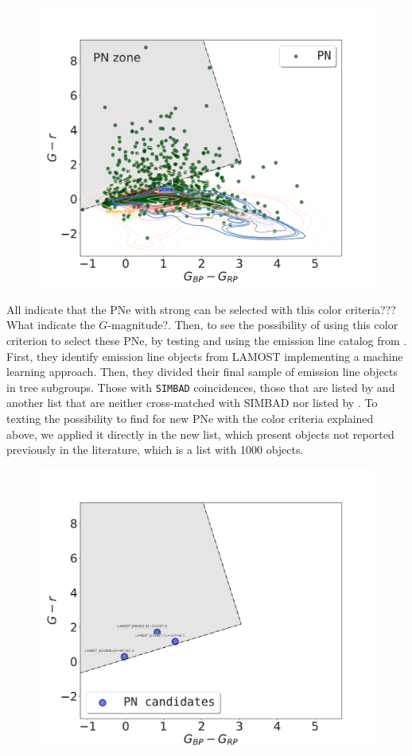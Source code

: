 \documentclass[fleqn,usenatbib]{mnras}
\begin{document}
\begin{figure}
\centering
  \includegraphics[width=0.9\linewidth]{Figs/color-diagram-ps-gaiaEDR3.pdf}
  \caption{} 
  \label{fig:gaia-ps}
\end{figure}

All indicate that the PNe with strong \ha{} can be selected with this color criteria??? What indicate the $G$-magnitude?.
Then, to see the possibility of using this color criterion to select these PNe, by
testing and using the emission line catalog from  \citet{Skoda:2020}. First, they
identify emission line objects from LAMOST  implementing a machine learning approach.
Then, they divided their final sample of emission line objects in tree subgroups. Those with \texttt{SIMBAD}
coincidences, those that are listed by \citet{Hou:2016} and another list that are neither cross-matched with
SIMBAD nor listed by  \citet{Hou:2016}. To texting the possibility to find for new PNe with the color criteria
explained above, we applied it directly in the new list, which present objects not reported
previously in the literature, which is a list with 1000 objects.

\begin{figure}
\centering
  \includegraphics[width=0.9\linewidth]{Figs/pn-candidates-gaiaDR3.pdf}
  \caption{} 
  \label{fig:gaia-ps-apply}
\end{figure}
\end{document}
